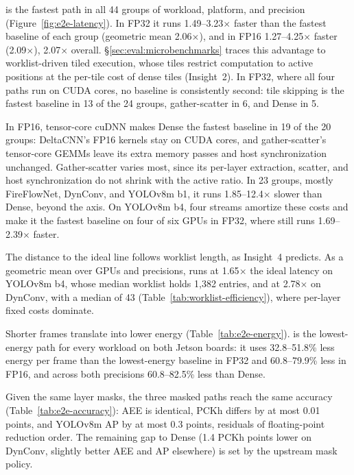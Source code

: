 \sysname is the fastest path in all 44 groups of workload, platform, and
precision (Figure~\ref{fig:e2e-latency}). In FP32 it runs 1.49--3.23$\times$
faster than the fastest baseline of each group (geometric mean 2.06$\times$),
and in FP16 1.27--4.25$\times$ faster (2.09$\times$), 2.07$\times$ overall. \S\ref{sec:eval:microbenchmarks} traces this advantage to worklist-driven
tiled execution, whose tiles restrict computation to active positions at the
per-tile cost of dense tiles (Insight~2). In FP32, where all four paths run on
CUDA cores, no baseline is consistently second: tile skipping is the fastest
baseline in 13 of the 24 groups, gather-scatter in 6, and Dense in 5.

In FP16, tensor-core cuDNN makes Dense the fastest baseline in 19 of the 20
groups: DeltaCNN's FP16 kernels stay on CUDA cores, and gather-scatter's
tensor-core GEMMs leave its extra memory passes and host synchronization
unchanged.
Gather-scatter varies most, since its per-layer extraction, scatter, and host
synchronization do not shrink with the active ratio. In 23 groups, mostly
FireFlowNet, DynConv, and YOLOv8m b1, it runs 1.85--12.4$\times$ slower than Dense, beyond the axis. On YOLOv8m b4, four streams amortize these
costs and make it the fastest baseline on four of six GPUs in FP32, where
\sysname still runs 1.69--2.39$\times$ faster.

The distance to the ideal line follows worklist length, as Insight~4
predicts. As a geometric mean over GPUs and precisions, \sysname runs at
1.65$\times$ the ideal latency on YOLOv8m b4, whose median worklist holds 1{,}382 entries, and
at 2.78$\times$ on DynConv, with a median of 43
(Table~\ref{tab:worklist-efficiency}), where per-layer fixed costs dominate.

Shorter frames translate into lower energy (Table~\ref{tab:e2e-energy}).
\sysname is the lowest-energy path for every workload on both Jetson boards:
it uses 32.8--51.8\% less energy per frame than the lowest-energy baseline in
FP32 and 60.8--79.9\% less in FP16, and across both precisions 60.8--82.5\%
less than Dense.



Given the same layer masks, the three masked paths reach the same accuracy
(Table~\ref{tab:e2e-accuracy}): AEE is identical, PCKh differs by at most
0.01 points, and YOLOv8m AP by at most 0.3 points, residuals of
floating-point reduction order. The remaining gap to Dense (1.4 PCKh points lower on DynConv, slightly better
AEE and AP elsewhere) is set by the upstream mask policy.

